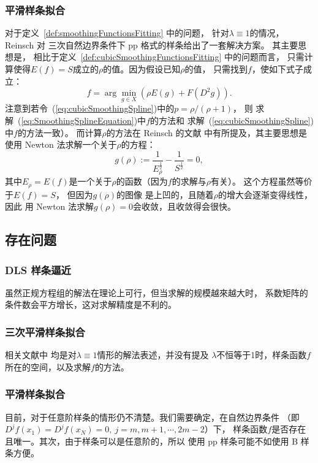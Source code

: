 \subsubsection{平滑样条拟合}
对于定义~\ref{def:smoothingFunctionsFitting} 中的问题，
针对$\lambda\equiv 1$的情况，
Reinsch \cite{SmoothingBySplineFunctions}对
三次自然边界条件下 pp 格式的样条给出了一套解决方案。
其主要思想是，
相比于定义~\ref{def:cubicSmoothingFunctionsFitting} 中的问题而言，
只需计算使得$E(f)=S$成立的$\rho$的值。因为假设已知$\rho$的值，
只需找到$f$，使如下式子成立：
\begin{equation}
  \label{eq:SmoothingSplineEquation}
  f=\arg \min_{g\in X}\left(\rho E(g)+ F(D^{2}g)\right).
\end{equation}
注意到若令~(\ref{eq:cubicSmoothingSpline})中的$p=\rho/(\rho+1)$，
则
求解~(\ref{eq:SmoothingSplineEquation})中$f$的方法和
求解~(\ref{eq:cubicSmoothingSpline})中$f$的方法一致）。
而计算$\rho$的方法在 Reinsch 的文献
\cite{SmoothingBySplineFunctions,SmoothingBySplineFunctionsII}
中有所提及，其主要思想是使用 Newton 法求解一个关于$\rho$的方程：
\begin{equation}
  \label{eq:rhoEqnForNewton}
  g(\rho):= \frac{1}{E_{\rho}^{\frac{1}{2}}}
  -\frac{1}{S^{\frac{1}{2}}}=0,
\end{equation}
其中$E_{\rho}=E(f)$是一个关于$\rho$的函数（因为$f$的求解与$\rho$有关）。
这个方程虽然等价于$E(f)=S$，
但因为$g(\rho)$的图像
是上凹的，且随着$\rho$的增大会逐渐变得线性，因此
用 Newton 法求解$g(\rho)=0$会收敛，且收敛得会很快。

\subsection{存在问题}

\subsubsection{ DLS 样条逼近}
虽然正规方程组的解法在理论上可行，但当求解的规模越來越大时，
系数矩阵的条件数会平方增长，这对求解精度是不利的。

\subsubsection{三次平滑样条拟合}
相关文献\cite{GuideToSplines,SmoothingBySplineFunctions}中
均是对$\lambda\equiv 1$情形的解法表述，并没有提及
$\lambda$不恒等于1时，样条函数$f$所在的空间，以及求解$f$的方法。

\subsubsection{平滑样条拟合}
目前，对于任意阶样条的情形仍不清楚。我们需要确定，在自然边界条件
（即$D^{j}f(x_{1})=D^{j}f(x_{N})=0,\ j=m,m+1,\cdots,2m-2$）下，
样条函数$f$是否存在且唯一。其次，由于样条可以是任意阶的，所以
使用 pp 样条可能不如使用 B 样条方便。

